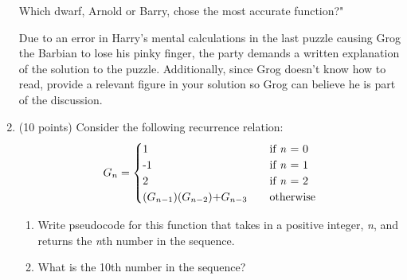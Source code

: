 \documentclass[12pt]{article}
\begin{document}
\begin{enumerate}
\begin{center}
\begin{tabular}{|c | c |}
        \end{tabular}
    \end{center}

    Which dwarf, Arnold or Barry, chose the most accurate function?"

    \normalsize
    Due to an error in Harry's mental calculations in the last puzzle causing Grog the Barbian to lose his pinky finger, the party demands  a written explanation of the solution to the puzzle. Additionally, since Grog doesn't know how to read, provide a relevant figure in your solution so Grog can believe he is part of the discussion.

    \newpage

 	\item (10 points) Consider the following recurrence relation:
\[
G_n =
     \begin{cases}
       \text{1} &\quad\text{if \textit{n} = 0}\\
       \text{-1} &\quad\text{if \textit{n} = 1}\\
       \text{2} &\quad\text{if \textit{n} = 2}\\
       \text{($G_{n-1}$)($G_{n-2}$)+$G_{n-3}$} &\quad\text{otherwise}\\
     \end{cases}
\]

 	\begin{enumerate}
 	\item Write pseudocode for this function that takes in a positive integer, \textit{n}, and returns the \textit{n}th number in the sequence.
 	\item What is the 10th number in the sequence?
 	\end{enumerate}

\end{enumerate}
\end{document}
